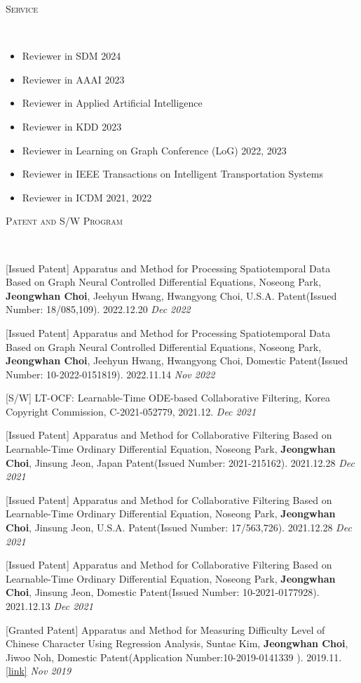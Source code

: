 \documentclass[10pt]{article}
\newenvironment{changemargin}[2]{
  \begin{list}{}{
    \setlength{\topsep}{0pt}
    \setlength{\leftmargin}{#1}
    \setlength{\rightmargin}{#2}
    \setlength{\listparindent}{\parindent}
    \setlength{\itemindent}{\parindent}
    \setlength{\parsep}{\parskip}
  }
  \item[]}{\end{list}
}
\newcommand{\lineover}{
	\begin{changemargin}{-0.05in}{-0.05in}
		\vspace*{-8pt}
		\hrulefill \\
		\vspace*{-2pt}
	\end{changemargin}
}
\newcommand{\header}[1]{
	\begin{changemargin}{-0.5in}{-0.5in}
		\scshape{#1}\\
  	\lineover
	\end{changemargin}
}
\newcommand{\presentation}[2]{
	{#1} \hfill \emph{#2}\\ \bigskip
}
\newenvironment{body} {
	\vspace*{-16pt}
	\begin{changemargin}{-0.25in}{-0.5in}
  }
	{\end{changemargin}
}
\begin{document}
\medskip

\header{Service}

\begin{body}
	\vspace{14pt}
    \begin{itemize}
        \item Reviewer in SDM 2024
        \item Reviewer in AAAI 2023
        \item Reviewer in Applied Artificial Intelligence 
        \item Reviewer in KDD 2023
        \item Reviewer in Learning on Graph Conference (LoG) 2022, 2023
        \item Reviewer in IEEE Transactions on Intelligent Transportation Systems
        \item Reviewer in ICDM 2021, 2022
    \end{itemize}
\end{body}

\medskip

\header{Patent and S/W Program}

\begin{body}
	\vspace{14pt}
	
\presentation{[Issued Patent] Apparatus and Method for Processing Spatiotemporal Data Based on Graph Neural Controlled Differential Equations, Noseong Park, \textbf{Jeongwhan Choi}, Jeehyun Hwang, Hwangyong Choi, U.S.A. Patent(Issued Number: 18/085,109). 2022.12.20}{Dec 2022}	
\presentation{[Issued Patent] Apparatus and Method for Processing Spatiotemporal Data Based on Graph Neural Controlled Differential Equations, Noseong Park, \textbf{Jeongwhan Choi}, Jeehyun Hwang, Hwangyong Choi, Domestic Patent(Issued Number: 10-2022-0151819). 2022.11.14}{Nov 2022}	
\presentation{[S/W] LT-OCF: Learnable-Time ODE-based Collaborative Filtering, Korea Copyright Commission, C-2021-052779, 2021.12.}{Dec 2021}	
\presentation{[Issued Patent] Apparatus and Method for Collaborative Filtering Based on Learnable-Time Ordinary Differential Equation, Noseong Park, \textbf{Jeongwhan Choi}, Jinsung Jeon, Japan Patent(Issued Number: 2021-215162). 2021.12.28}{Dec 2021}	
\presentation{[Issued Patent] Apparatus and Method for Collaborative Filtering Based on Learnable-Time Ordinary Differential Equation, Noseong Park, \textbf{Jeongwhan Choi}, Jinsung Jeon, U.S.A. Patent(Issued Number: 	17/563,726). 2021.12.28}{Dec 2021}	
\presentation{[Issued Patent] Apparatus and Method for Collaborative Filtering Based on Learnable-Time Ordinary Differential Equation, Noseong Park, \textbf{Jeongwhan Choi}, Jinsung Jeon, Domestic Patent(Issued Number: 10-2021-0177928). 2021.12.13}{Dec 2021}	
\presentation{[Granted Patent] Apparatus and Method for Measuring Difficulty Level of Chinese Character Using Regression Analysis, Suntae Kim, \textbf{Jeongwhan Choi}, Jiwoo Noh, Domestic Patent(Application Number:10-2019-0141339 ). 2019.11. \href{https://doi.org/10.8080/1020190141339}{[link]}}{Nov 2019}	
  
\end{body}
    
\end{document}
